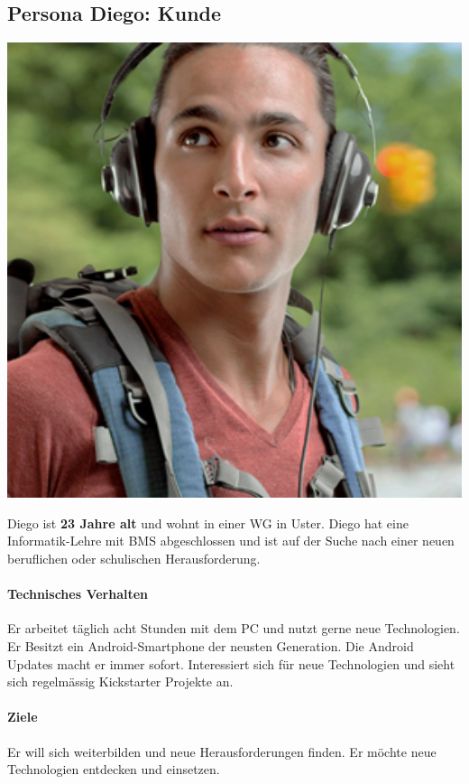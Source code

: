 \subsection{Persona Diego: Kunde}
\begin{minipage}{0.25\textwidth}%
\centering
\includegraphics[width=1.0\textwidth]{images/persona-diego.jpg}
\label{fig:diego}
\end{minipage}%
\hfill%
\begin{minipage}{0.70\textwidth}
Diego ist \textbf{23 Jahre alt} und wohnt in einer WG in Uster.
Diego hat eine Informatik-Lehre mit BMS abgeschlossen und ist auf der Suche nach einer neuen beruflichen oder schulischen Herausforderung.
\paragraph{Technisches Verhalten}
Er arbeitet täglich acht Stunden mit dem PC und nutzt gerne neue Technologien. Er Besitzt ein Android-Smartphone der neusten Generation. Die Android Updates macht er immer sofort. Interessiert sich für neue Technologien und sieht sich regelmässig Kickstarter Projekte an.
\paragraph{Ziele}
Er will sich weiterbilden und neue Herausforderungen finden. Er möchte neue Technologien entdecken und einsetzen.
\end{minipage}

